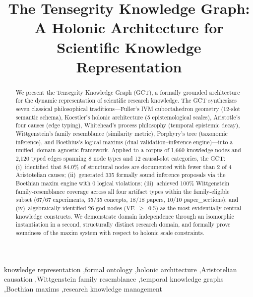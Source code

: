 \documentclass{iosart2x}
\begin{document}
\begin{frontmatter}

\title{The Tensegrity Knowledge Graph: A Holonic Architecture for Scientific Knowledge Representation}

\author[a]{ }
\author[a]{ }

\address[a]{Independent Research Group, Colombia}

\begin{abstract}
We present the Tensegrity Knowledge Graph (GCT), a formally grounded architecture for the dynamic representation of scientific research knowledge. The GCT synthesizes seven classical philosophical traditions---Fuller's IVM cuboctahedron geometry (12-slot semantic schema), Koestler's holonic architecture (5 epistemological scales), Aristotle's four causes (edge typing), Whitehead's process philosophy (temporal epistemic decay), Wittgenstein's family resemblance (similarity metric), Porphyry's tree (taxonomic inference), and Boethius's logical maxims (dual validation--inference engine)---into a unified, domain-agnostic framework. Applied to a corpus of 1,660 knowledge nodes and 2,120 typed edges spanning 8 node types and 12 causal-slot categories, the GCT: (i)~identified that 84.0\% of structural nodes are documented with fewer than 2 of 4 Aristotelian causes; (ii)~generated 335 formally sound inference proposals via the Boethian maxim engine with 0 logical violations; (iii)~achieved 100\% Wittgenstein family-resemblance coverage across all four artifact types within the family-eligible subset (67/67 experiments, 35/35 concepts, 18/18 papers, 10/10 paper\_sections); and (iv)~algebraically identified 26 god nodes (VE~$\geq$~0.5) as the most evidentially central knowledge constructs. We demonstrate domain independence through an isomorphic instantiation in a second, structurally distinct research domain, and formally prove soundness of the maxim system with respect to holonic scale constraints.
\end{abstract}

\begin{keyword}
knowledge representation \sep formal ontology \sep holonic architecture \sep Aristotelian causation \sep Wittgenstein family resemblance \sep temporal knowledge graphs \sep Boethian maxims \sep research knowledge management
\end{keyword}

\end{frontmatter}
\end{document}
